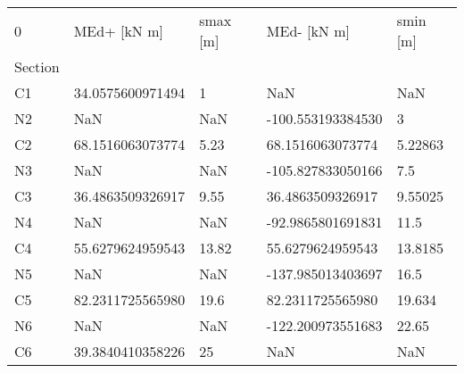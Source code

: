 \begin{tabular}{lllll}
\toprule
0 &       MEd+ [kN m] & smax [m] &        MEd- [kN m] & smin [m] \\
Section &                   &          &                    &          \\
\midrule
C1      &  34.0575600971494 &        1 &                NaN &      NaN \\
N2      &               NaN &      NaN &  -100.553193384530 &        3 \\
C2      &  68.1516063073774 &     5.23 &   68.1516063073774 &  5.22863 \\
N3      &               NaN &      NaN &  -105.827833050166 &      7.5 \\
C3      &  36.4863509326917 &     9.55 &   36.4863509326917 &  9.55025 \\
N4      &               NaN &      NaN &  -92.9865801691831 &     11.5 \\
C4      &  55.6279624959543 &    13.82 &   55.6279624959543 &  13.8185 \\
N5      &               NaN &      NaN &  -137.985013403697 &     16.5 \\
C5      &  82.2311725565980 &     19.6 &   82.2311725565980 &   19.634 \\
N6      &               NaN &      NaN &  -122.200973551683 &    22.65 \\
C6      &  39.3840410358226 &       25 &                NaN &      NaN \\
\bottomrule
\end{tabular}
